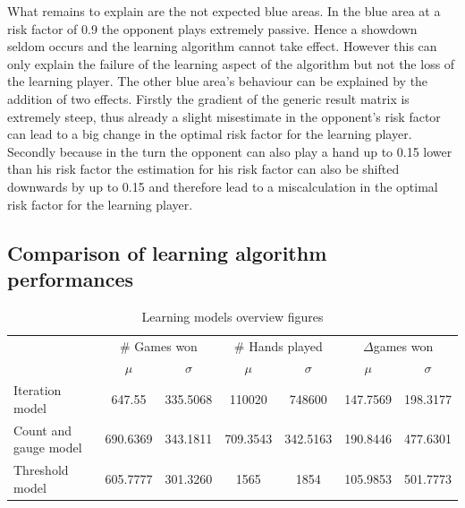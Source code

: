 \documentclass[11pt]{article}
\begin{document}
What remains to explain are the not expected blue areas. In the blue area at a risk factor of 0.9 the opponent plays extremely passive. Hence a showdown seldom occurs and the learning algorithm cannot take effect. However this can only explain the failure of the learning aspect of the algorithm but not the loss of the learning player. The other blue area's behaviour can be explained by the addition of two effects. Firstly the gradient of the generic result matrix is extremely steep, thus already a slight misestimate in the opponent's risk factor can lead to a big change in the optimal risk factor for the learning player. Secondly because in the turn the opponent can also play a hand up to 0.15 lower than his risk factor the estimation for his risk factor can also be shifted downwards by up to 0.15 and therefore lead to a miscalculation in the optimal risk factor for the learning player.


\subsection{Comparison of learning algorithm performances}


\begin{table}[]
\centering
\caption{Learning models overview figures}


\label{Learning models overview}
\begin{tabular}{lcccccc}
\cline{2-7}
                                           & \multicolumn{2}{c}{\# Games won}                      & \multicolumn{2}{c}{\# Hands played}                   & \multicolumn{2}{c}{$\Delta$games won} \\ \cline{2-7} 
\multicolumn{1}{c|}{}                       & \multicolumn{1}{c|}{$\mu$} & \multicolumn{1}{c|}{$\sigma$} & \multicolumn{1}{c|}{$\mu$} & \multicolumn{1}{c|}{$\sigma$} & \multicolumn{1}{c|}{$\mu$} & $\sigma$ \\ \hline


\multicolumn{1}{l|}{Iteration model}           & 647.55                     & \multicolumn{1}{c|}{335.5068}         & 110020                     & \multicolumn{1}{c|}{748600}   & 147.7569                            & 198.3177        \\ \hline
\multicolumn{1}{l|}{Count and gauge model} & 690.6369                   & \multicolumn{1}{c|}{343.1811} & 709.3543                   & \multicolumn{1}{c|}{342.5163} & 190.8446                   & 477.6301 \\ \hline
\multicolumn{1}{l|}{Threshold model}       & 605.7777                   & \multicolumn{1}{c|}{301.3260} & 1565                       & \multicolumn{1}{c|}{1854}     & 105.9853                   & 501.7773 \\ \hline


\end{tabular}
\end{table}
\end{document}
